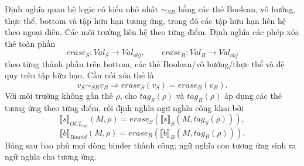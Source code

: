 \documentclass[11pt,a4paper]{article}
\theoremstyle{definition}
\newcommand{\sem}[2]{\llbracket #1 \rrbracket_{#2}}
\begin{document}
Định nghĩa quan hệ logic có kiểu nhỏ nhất $\sim_{SB}$ bằng các thẻ Boolean, vô
hướng, thực thể, bottom và tập hữu hạn tương ứng, trong đó các tập hữu hạn liên
hệ theo ngoại diên. Các môi trường liên hệ theo từng điểm. Định nghĩa các phép
xóa thẻ toàn phần
\[
erase_S:Val_S\to Val_{obj},\qquad erase_B:Val_B\to Val_{obj}
\]
theo từng thành phần trên bottom, các thẻ Boolean/vô hướng/thực thể và đệ quy
trên tập hữu hạn. Cầu nối xóa thẻ là
\[
v_S\sim_{SB}v_B\Longrightarrow erase_S(v_S)=erase_B(v_B).
\]
Với môi trường không gắn thẻ $\rho$, cho $tag_S(\rho)$ và $tag_B(\rho)$ áp dụng
các thẻ tương ứng theo từng điểm, rồi định nghĩa ngữ nghĩa công khai bởi
\[
\sem{s}{OCL_{val}}(M,\rho)
=erase_S(\sem{s}{S}(M,tag_S(\rho))),
\]
\[
\sem{b}{Bound}(M,\rho)
=erase_B(\sem{b}{B}(M,tag_B(\rho))).
\]
Bảng sau bao phủ mọi dòng binder thành công; ngữ nghĩa con tương ứng sinh ra
ngữ nghĩa cha tương ứng.
\end{document}
